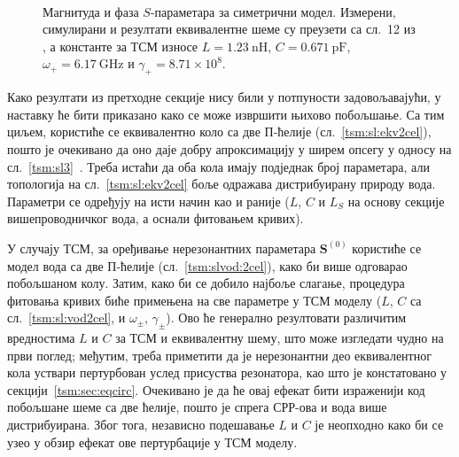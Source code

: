\begin{figure}[!t]
\centering
{}\\
\caption{Магнитуда и фаза $S$-параметара за симетрични модел. Измерени, симулирани и резултати еквивалентне шеме су преузети са сл.~12 из \cite{radoman}, а константе за ТСМ износе $L=\SI{1.23}{\nano\henry}$, $C=\SI{0.671}{\pico\farad}$, $\omega_+ = \SI{6.17}{\giga\hertz}$ и $\gamma_+ = 8.71 \times 10^8$.}
\label{tsm:rez:pod180sim}
\end{figure}

Како резултати из претходне секције нису били у потпуности задовољавајући, у наставку ће бити приказано како се може извршити њихово побољшање. Са тим циљем, користиће се еквивалентно коло са две П-ћелије (сл.~\ref{tsm:sl:ekv2cel}), пошто је очекивано да оно даје добру апроксимацију у ширем опсегу у односу на сл.~\ref{tsm:sl3}~\cite{radoman}. Треба истаћи да оба кола имају подједнак број параметара, али топологија на сл.~\ref{tsm:sl:ekv2cel} боље одражава дистрибуирану природу вода. Параметри се одређују на исти начин као и раније ($L$, $C$ и $L_S$ на основу секције вишепроводничког вода, а оснали фитовањем кривих).

У случају ТСМ, за оређивање нерезонантних параметара $\mathbf{S}^{(0)}$ користиће се модел вода са две П-ћелије (сл.~\ref{tsm:slvod:2cel}), како би више одговарао побољшаном колу. Затим, како би се добило најбоље слагање, процедура фитовања кривих биће примењена на све параметре у ТСМ моделу ($L$, $C$ са сл.~\ref{tsm:sl:vod2cel}, и $\omega_\pm$, $\gamma_\pm$). Ово ће генерално резултовати различитим вредностима $L$ и $C$ за ТСМ и еквивалентну шему, што може изгледати чудно на први поглед; међутим, треба приметити да је нерезонантни део еквивалентног кола уствари пертурбован услед присуства резонатора, као што је констатовано у секцији~\ref{tsm:sec:eqcirc}. Очекивано је да ће овај ефекат бити израженији код побољшане шеме са две ћелије, пошто је спрега СРР-ова и вода више дистрибуирана. Због тога, независно подешавање $L$ и $C$ је неопходно како би се узео у обзир ефекат ове пертурбације у ТСМ моделу.


